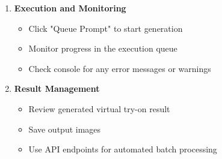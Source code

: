 \begin{enumerate}
    \item \textbf{Execution and Monitoring}
    \begin{itemize}
        \item Click "Queue Prompt" to start generation
        \item Monitor progress in the execution queue
        \item Check console for any error messages or warnings
    \end{itemize}
    
    \item \textbf{Result Management}
    \begin{itemize}
        \item Review generated virtual try-on result
        \item Save output images
        \item Use API endpoints for automated batch processing
    \end{itemize}
\end{enumerate}
